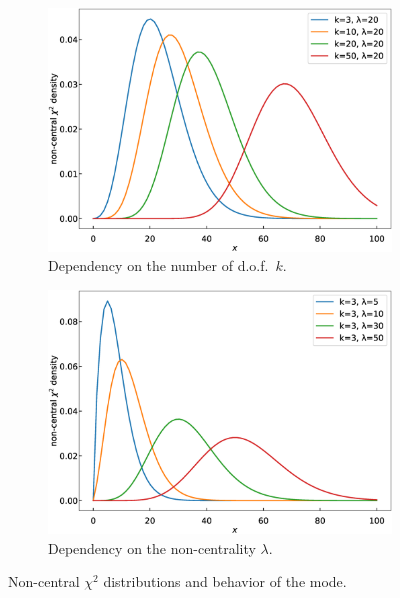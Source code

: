 \documentclass[final,5p,twocolumn,times,authoryear]{elsarticle}
\begin{document}
\begin{figure}[h]
	\centering
	\begin{subfigure}[t]{0.22\textwidth}
		\centering
		\includegraphics[width=\linewidth]{ncx2-of-df.eps}
		\caption{Dependency on the number of d.o.f.~$k$.}\label{fig:ncx2-curves-df}
	\end{subfigure}
	\quad
	\begin{subfigure}[t]{0.22\textwidth}
		\centering
		\includegraphics[width=\linewidth]{ncx2-of-lambda.eps}
		\caption{Dependency on the non-centrality $\lambda$.}\label{fig:ncx2-curves-lambda}
	\end{subfigure}
	\caption{Non-central $\chi^2$ distributions and behavior of the mode.}\label{fig:ncx2-curves}
\end{figure}
\end{document}
